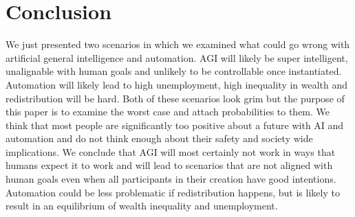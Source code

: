 \documentclass[conference]{IEEEtran}
\begin{document}
\section{Conclusion}
%
We just presented two scenarios in which we examined what could go wrong with artificial general intelligence and automation. AGI will likely be super intelligent, unalignable with human goals and unlikely to be controllable once instantiated. Automation will likely lead to high unemployment, high inequality in wealth and redistribution will be hard.
Both of these scenarios look grim but the purpose of this paper is to examine the worst case and attach probabilities to them. We think that most people are significantly too positive about a future with AI and automation and do not think enough about their safety and society wide implications. We conclude that AGI will most certainly not work in ways that humans expect it to work and will lead to scenarios that are not aligned with human goals even when all participants in their creation have good intentions. Automation could be less problematic if redistribution happens, but is likely to result in an equilibrium of wealth inequality and unemployment.



\end{document}
